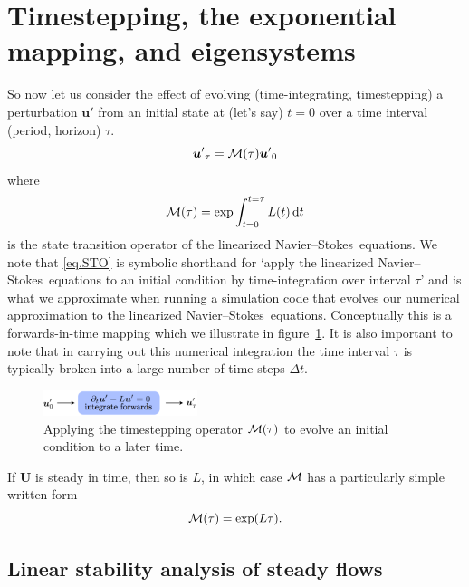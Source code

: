 \documentclass[11pt,a4paper]{report}
\newcommand\cd{\mathrm{d}}
\newcommand\NavSto{Navier--Stokes}
\newcommand\LNS{linearized \NavSto}
\newcommand\LNSE{\LNS\ equations}
\newcommand\Ubase{{\bm{U}}}
\newcommand\upert{{\bm{u}'}}
\newcommand\Lop{{L}}
\newcommand\Mop{{\cal M}}
\begin{document}
\section{Timestepping, the exponential mapping, and eigensystems}
\label{sec.timestep}

So now let us consider the effect of evolving (time-integrating,
timestepping) a perturbation $\upert$ from an initial state at (let's
say) $t=0$ over a time interval (period, horizon) $\tau$.
\begin{equation}
\upert_\tau=\Mop(\tau)\upert_0
\label{eq.STO}
\end{equation}
where 
\begin{equation}
\Mop(\tau) = \exp \int_{t=0}^{t=\tau}\Lop(t)\,\cd t
\end{equation}
is the state transition operator of the \LNSE. We note that
\eqref{eq.STO} is symbolic shorthand for `apply the \LNS\ equations to
an initial condition by time-integration over interval $\tau$' and is
what we approximate when running a simulation code that evolves our
numerical approximation to the \LNSE. Conceptually this is a
forwards-in-time mapping which we illustrate in
figure~\ref{fig.forwards}. It is also important to note that in
carrying out this numerical integration the time interval $\tau$ is
typically broken into a large number of time steps $\Delta t$.
%
\begin{figure}
\begin{center}
\includegraphics[width=0.4\textwidth]{forwards}
\end{center}
\caption{Applying the timestepping operator $\Mop(\tau)$ to evolve an
  initial condition to a later time.}
\label{fig.forwards}
\end{figure}

If $\Ubase$ is steady in time, then so is $\Lop$, in which case $\Mop$
has a particularly simple written form
\begin{equation}
\Mop(\tau)=\exp(\Lop\tau).
\label{eq.map}
\end{equation}

\subsection{Linear stability analysis of steady flows}
\label{sec.steady}
\end{document}

